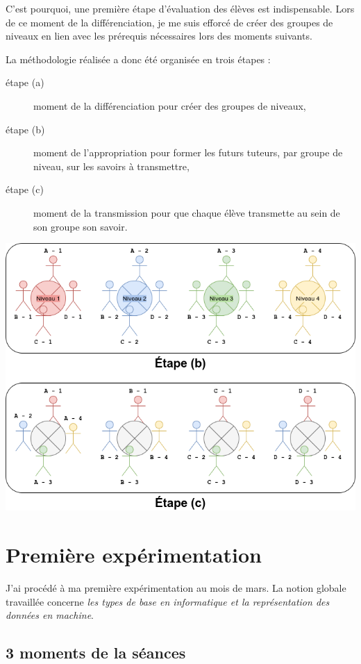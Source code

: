 C'est pourquoi, une première étape d'évaluation des élèves est indispensable. Lors de ce moment de la différenciation, je me suis efforcé de créer des groupes de niveaux en lien avec les prérequis nécessaires lors des moments suivants.

La méthodologie réalisée a donc été organisée en trois étapes :

\begin{description}
    \item[étape (a)] moment de la différenciation pour créer des groupes de niveaux,
    \item[étape (b)] moment de l'appropriation pour former les futurs tuteurs, par groupe de niveau, sur les savoirs à transmettre,
    \item[étape (c)] moment de la transmission pour que chaque élève transmette au sein de son groupe son savoir.
\end{description}


\begin{center}
    \includegraphics[width=0.75\linewidth]{res/diagramme.drawio.png}
\end{center}



\section{Première expérimentation}


J'ai procédé à ma première expérimentation au mois de mars. La notion globale travaillée concerne \emph{les types de base en informatique et la représentation des données en machine}.



\subsection{3 moments de la séances}



